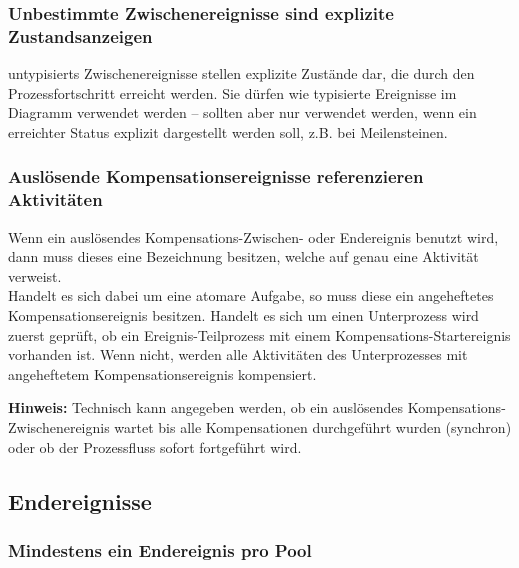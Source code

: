\documentclass[12pt,report]{snetTeaching}
\begin{document}
\subsubsection{Unbestimmte Zwischenereignisse sind explizite Zustandsanzeigen}

\Glspl{untypisiert} Zwischenereignisse stellen explizite Zustände dar, die durch den Prozessfortschritt erreicht werden. Sie dürfen wie typisierte Ereignisse im Diagramm verwendet werden -- sollten aber nur verwendet werden, wenn ein erreichter Status explizit dargestellt werden soll, z.B. bei Meilensteinen.

\begin{Rahmen}
\end{Rahmen}




\subsubsection{Auslösende Kompensationsereignisse referenzieren Aktivitäten}

Wenn ein auslösendes Kompensations-Zwischen- oder Endereignis benutzt wird, dann muss dieses eine Bezeichnung besitzen, welche auf genau eine  Aktivität verweist. \\
Handelt es sich dabei um eine atomare Aufgabe, so muss diese ein angeheftetes Kompensationsereignis besitzen. 
Handelt es sich um einen Unterprozess wird zuerst geprüft, ob ein Ereignis-Teilprozess mit einem Kompensations-Startereignis vorhanden ist. Wenn nicht, werden alle Aktivitäten des Unterprozesses mit angeheftetem Kompensationsereignis kompensiert.

\begin{Rahmen}
\end{Rahmen}

\textbf{Hinweis:} Technisch kann angegeben werden, ob ein auslösendes Kompensations-Zwischenereignis wartet bis alle Kompensationen durchgeführt wurden (synchron) oder ob der Prozessfluss sofort fortgeführt wird.


\clearpage
\subsection{Endereignisse}

\subsubsection{Mindestens ein Endereignis pro Pool}
\end{document}
